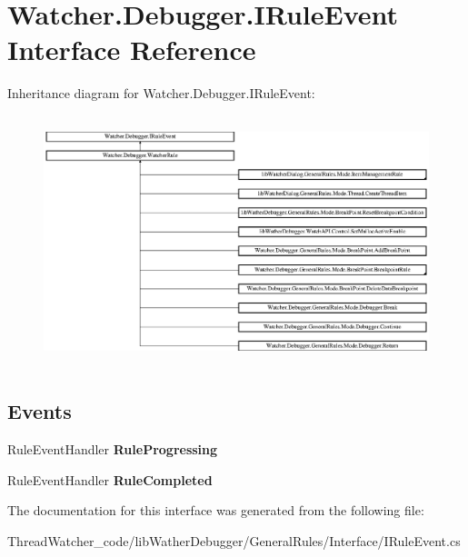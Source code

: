 \hypertarget{interface_watcher_1_1_debugger_1_1_i_rule_event}{\section{Watcher.\+Debugger.\+I\+Rule\+Event Interface Reference}
\label{interface_watcher_1_1_debugger_1_1_i_rule_event}
}
Inheritance diagram for Watcher.\+Debugger.\+I\+Rule\+Event\+:\begin{figure}[H]
\begin{center}
\leavevmode
\includegraphics[height=7.336245cm]{interface_watcher_1_1_debugger_1_1_i_rule_event}
\end{center}
\end{figure}
\subsection*{Events}
\begin{DoxyCompactItemize}
\item 
\hypertarget{interface_watcher_1_1_debugger_1_1_i_rule_event_ae866825760424d5ee88a8f9d907f530f}{Rule\+Event\+Handler {\bfseries Rule\+Progressing}}\label{interface_watcher_1_1_debugger_1_1_i_rule_event_ae866825760424d5ee88a8f9d907f530f}

\item 
\hypertarget{interface_watcher_1_1_debugger_1_1_i_rule_event_af5b2a2f665b71a104d247f9ae5ba1200}{Rule\+Event\+Handler {\bfseries Rule\+Completed}}\label{interface_watcher_1_1_debugger_1_1_i_rule_event_af5b2a2f665b71a104d247f9ae5ba1200}

\end{DoxyCompactItemize}


The documentation for this interface was generated from the following file\+:\begin{DoxyCompactItemize}
\item 
Thread\+Watcher\+\_\+code/lib\+Wather\+Debugger/\+General\+Rules/\+Interface/I\+Rule\+Event.\+cs\end{DoxyCompactItemize}

